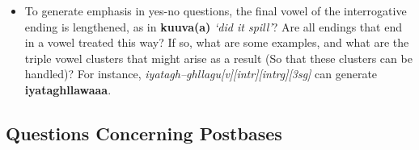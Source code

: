\documentclass{article}
\begin{document}
\begin{itemize}
\item To generate emphasis in yes-no questions, the final vowel of the interrogative ending is lengthened, as in \textbf{kuuva(a)} \textit{`did it spill'}? Are all endings that end in a vowel treated this way? If so, what are some examples, and what are the triple vowel clusters that might arise as a result (So that these clusters can be handled)? For instance, \textit{iyatagh--ghllagu\textsc[v][intr][intrg][3sg]} can generate \textbf{iyataghllawaaa}.
\end{itemize}

\subsection{Questions Concerning Postbases}
\end{document}
